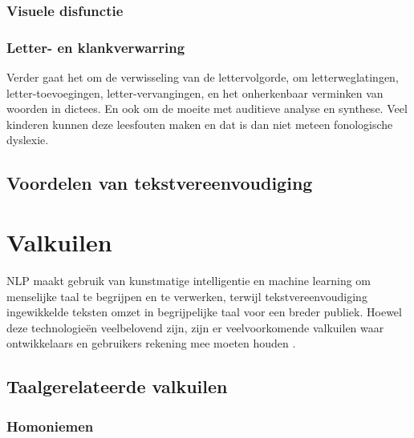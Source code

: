 \subsubsection{Visuele disfunctie}


\subsubsection{Letter- en klankverwarring}
Verder gaat het om de verwisseling van de lettervolgorde, om letterweglatingen, letter-toevoegingen, letter-vervangingen, en het onherkenbaar verminken van woorden in dictees. En ook om de moeite met auditieve analyse en synthese. Veel kinderen kunnen deze leesfouten maken en dat is dan niet meteen fonologische dyslexie.

\subsection{Voordelen van tekstvereenvoudiging}






\section{Valkuilen}

NLP maakt gebruik van kunstmatige intelligentie en machine learning om menselijke taal te begrijpen en te verwerken, terwijl tekstvereenvoudiging ingewikkelde teksten omzet in begrijpelijke taal voor een breder publiek. Hoewel deze technologieën veelbelovend zijn, zijn er veelvoorkomende valkuilen waar ontwikkelaars en gebruikers rekening mee moeten houden \autocite{Sciforce2020, Roldos2020, Khurana2022}.

\subsection{Taalgerelateerde valkuilen}

\subsubsection{Homoniemen}


